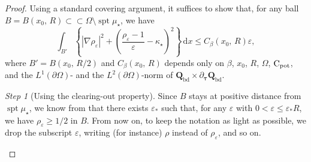 \documentclass[a4paper, 11pt, twoside, leqno]{article}
\theoremstyle{definition}              %
\theoremstyle{remark}                  %
\newtheorem{step}{Step}
\DeclareMathOperator{\spt}{spt}                                     %
\newcommand{\abs}[1]{\left| #1 \right|}                             %
\newcommand{\csubset}{\subset\!\subset}                             %
\renewcommand{\d}{\mathrm{d}}
\newcommand{\Q}{\mathbf{Q}}
\newcommand{\eps}{\varepsilon}
\newcommand{\Cpot}{{\rm C}_{\rm pot}}
\newcommand{\ttau}{{\boldsymbol{\tau}}}
\newcommand{\Qb}{\Q_{\mathrm{bd}}}
\begin{document}
\begin{proof}	
	Using a standard covering argument, it suffices to show 
	that, for any ball $B = B(x_0,\,R) \csubset \Omega \setminus \spt\mu_\star$, we have 
	\begin{equation}\label{eq:improved-decay-rho-B}
        \int_{B'} \left\{ \abs{\nabla \rho_\eps}^2 + \left(\frac{\rho_\eps -1}{\eps} - \kappa_\star \right)^2 \right\}\,{\d}x \leq C_\beta(x_0,\,R) \eps, 
    \end{equation}
	where $B' = B(x_0,\,R/2)$ and $C_\beta(x_0,\,R)$ 
	depends only on $\beta$, $x_0$, $R$, $\Omega$, $\Cpot$, and 
	the $L^1(\partial\Omega)$- and the $L^2(\partial\Omega)$-norm of 
	$\Qb \times \partial_{\ttau} \Qb$.
	
	\setcounter{step}{0}    
	\begin{step}[Using the clearing-out property]
	Since $B$ stays at positive distance from $\spt\mu_\star$, 
	we know from \cite[Proposition~2.5 and Lemma~3.3]{CDS1} that there exists $\eps_*$ 
    such that, for any $\eps$ with $0 < \eps \leq \eps_* R$, 
    we have $\rho_\eps \geq 1/2$ in $B$. 
    From now on, to keep the notation as light as possible, 
    we drop the subscript $\eps$, writing (for instance)
    $\rho$ instead of $\rho_\eps$, and so on.
    

\end{step}
\end{proof}
\end{document}
